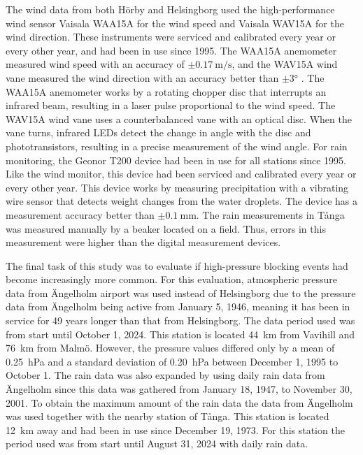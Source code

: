 The wind data from both Hörby and Helsingborg used the high-performance wind sensor Vaisala WAA15A for the wind speed and Vaisala WAV15A for the wind direction. These instruments were serviced and calibrated every year or every other year, and had been in use since 1995. The WAA15A anemometer measured wind speed with an accuracy of $\pm\SI{0.17}{\m\per\s}$, and the WAV15A wind vane measured the wind direction with an accuracy better than $\pm\ang{3}$ \cite{vaisalaWindSetWA152021}. The WAA15A anemometer works by a rotating chopper disc that interrupts an infrared beam, resulting in a laser pulse proportional to the wind speed. The WAV15A wind vane uses a counterbalanced vane with an optical disc. When the vane turns, infrared LEDs detect the change in angle with the disc and phototransistors, resulting in a precise measurement of the wind angle. For rain monitoring, the Geonor T200 device had been in use for all stations since 1995. Like the wind monitor, this device had been serviced and calibrated every year or every other year. This device works by measuring precipitation with a vibrating wire sensor that detects weight changes from the water droplets\cite{geonorinc.T200BSeriesAll2019}. The device has a measurement accuracy better than $\pm\SI{0.1}{\mm}$. The rain measurements in Tånga was measured manually by a beaker located on a field. Thus, errors in this measurement were higher than the digital measurement devices. 

The final task of this study was to evaluate if high-pressure blocking events had become increasingly more common. For this evaluation, atmospheric pressure data from Ängelholm airport was used instead of Helsingborg due to the pressure data from Ängelholm being active from January 5, 1946, meaning it has been in service for 49 years longer than that from Helsingborg. The data period used was from start until October 1, 2024. This station is located \SI{44}{\km} from Vavihill and \SI{76}{\km} from Malmö. However, the pressure values differed only by a mean of \SI{0.25}{\hecto\pascal} and a standard deviation of \SI{0.20}{\hecto\pascal} between December 1, 1995 to October 1. The rain data was also expanded by using daily rain data from Ängelholm since this data was gathered from January 18, 1947, to November 30, 2001. To obtain the maximum amount of the rain data the data from Ängelholm was used together with the nearby station of Tånga. This station is located \SI{12}{\km} away and had been in use since December 19, 1973. For this station the period used was from start until August 31, 2024 with daily rain data.  

